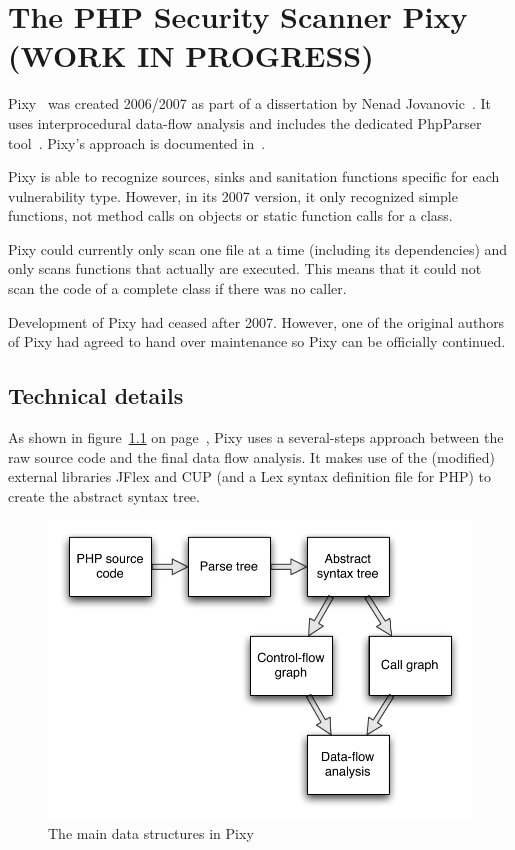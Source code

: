 \chapter{The PHP Security Scanner Pixy (WORK IN PROGRESS)}
\label{pixy}
Pixy~\cite{pixy} was created 2006/2007 as part of a dissertation by Nenad Jovanovic~\cite{pixy-dissertation}. It uses interprocedural data-flow analysis and includes the dedicated PhpParser tool~\cite{phpparser}. Pixy's approach is documented in~\cite{pixy-short, pixy-long, pixy-technical, pixy-dissertation}.

Pixy is able to recognize sources, sinks and sanitation functions specific for each vulnerability type. However, in its 2007 version, it only recognized simple functions, not method calls on objects or static function calls for a class.

Pixy could currently only scan one file at a time (including its dependencies) and only scans functions that actually are executed. This means that it could not scan the code of a complete class if there was no caller.

Development of Pixy had ceased after 2007. However, one of the original authors of Pixy had agreed to hand over maintenance so Pixy can be officially continued.

\section{Technical details}

As shown in figure~\ref{fig:pixy-data-structures} on page~\pageref{fig:pixy-data-structures}, Pixy uses a several-steps approach between the raw source code and the final data flow analysis. It makes use of the (modified) external libraries JFlex and CUP (and a Lex syntax definition file for PHP) to create the abstract syntax tree.

\begin{figure}[!h]
 \includegraphics[scale=0.8]{images/Pixy-Arbeitsweise}
 \caption{The main data structures in Pixy}
 \label{fig:pixy-data-structures}
\end{figure}
